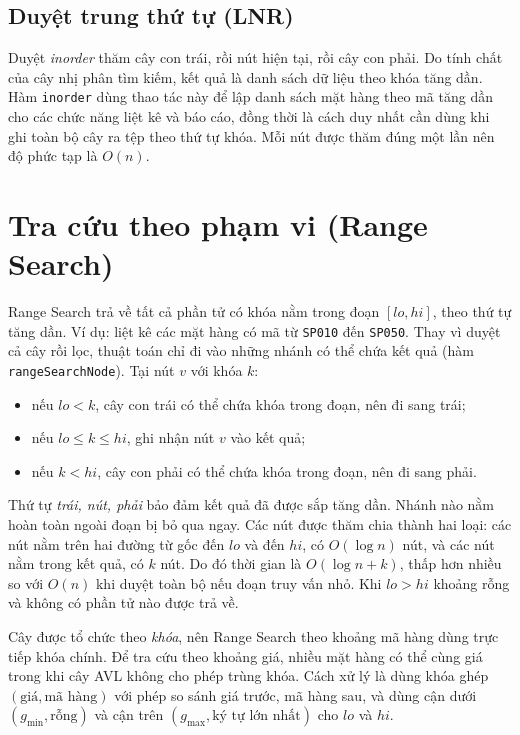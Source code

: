 \subsection{Duyệt trung thứ tự (LNR)}

Duyệt \emph{inorder} thăm cây con trái, rồi nút hiện tại, rồi cây con phải. Do tính
chất của cây nhị phân tìm kiếm, kết quả là danh sách dữ liệu theo khóa tăng dần.
Hàm \texttt{inorder} dùng thao tác này để lập danh sách mặt hàng theo mã tăng dần
cho các chức năng liệt kê và báo cáo, đồng thời là cách duy nhất cần dùng khi ghi
toàn bộ cây ra tệp theo thứ tự khóa. Mỗi nút được thăm đúng một lần nên độ phức
tạp là $O(n)$.

\section{Tra cứu theo phạm vi (Range Search)}\label{sec:avl-range}

Range Search trả về tất cả phần tử có khóa nằm trong đoạn $[lo, hi]$, theo thứ tự
tăng dần. Ví dụ: liệt kê các mặt hàng có mã từ \texttt{SP010} đến \texttt{SP050}.
Thay vì duyệt cả cây rồi lọc, thuật toán chỉ đi vào những nhánh có thể chứa kết
quả (hàm \texttt{rangeSearchNode}). Tại nút $v$ với khóa $k$:
\begin{itemize}
  \item nếu $lo < k$, cây con trái có thể chứa khóa trong đoạn, nên đi sang trái;
  \item nếu $lo \le k \le hi$, ghi nhận nút $v$ vào kết quả;
  \item nếu $k < hi$, cây con phải có thể chứa khóa trong đoạn, nên đi sang phải.
\end{itemize}
Thứ tự \emph{trái, nút, phải} bảo đảm kết quả đã được sắp tăng dần. Nhánh nào nằm
hoàn toàn ngoài đoạn bị bỏ qua ngay. Các nút được thăm chia thành hai loại: các
nút nằm trên hai đường từ gốc đến $lo$ và đến $hi$, có $O(\log n)$ nút, và các nút
nằm trong kết quả, có $k$ nút. Do đó thời gian là $O(\log n + k)$, thấp hơn nhiều
so với $O(n)$ khi duyệt toàn bộ nếu đoạn truy vấn nhỏ. Khi $lo > hi$ khoảng rỗng và
không có phần tử nào được trả về.

Cây được tổ chức theo \emph{khóa}, nên Range Search theo khoảng mã hàng dùng trực
tiếp khóa chính. Để tra cứu theo khoảng giá, nhiều mặt hàng có thể cùng giá trong
khi cây AVL không cho phép trùng khóa. Cách xử lý là dùng khóa ghép
$(\text{giá}, \text{mã hàng})$ với phép so sánh giá trước, mã hàng sau, và dùng cận
dưới $(g_{\min}, \text{rỗng})$ và cận trên $(g_{\max}, \text{ký tự lớn nhất})$
cho $lo$ và $hi$.

